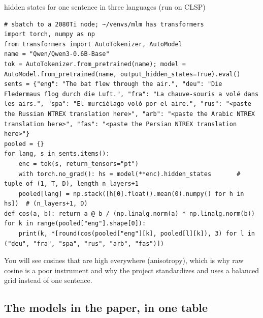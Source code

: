 \begin{exercise}{hidden states for one sentence in three languages (run on CLSP)}
\begin{lstlisting}
# sbatch to a 2080Ti node; ~/venvs/mlm has transformers
import torch, numpy as np
from transformers import AutoTokenizer, AutoModel
name = "Qwen/Qwen3-0.6B-Base"
tok = AutoTokenizer.from_pretrained(name); model = AutoModel.from_pretrained(name, output_hidden_states=True).eval()
sents = {"eng": "The bat flew through the air.", "deu": "Die Fledermaus flog durch die Luft.", "fra": "La chauve-souris a volé dans les airs.", "spa": "El murciélago voló por el aire.", "rus": "<paste the Russian NTREX translation here>", "arb": "<paste the Arabic NTREX translation here>", "fas": "<paste the Persian NTREX translation here>"}
pooled = {}
for lang, s in sents.items():
    enc = tok(s, return_tensors="pt")
    with torch.no_grad(): hs = model(**enc).hidden_states       # tuple of (1, T, D), length n_layers+1
    pooled[lang] = np.stack([h[0].float().mean(0).numpy() for h in hs])  # (n_layers+1, D)
def cos(a, b): return a @ b / (np.linalg.norm(a) * np.linalg.norm(b))
for k in range(pooled["eng"].shape[0]):
    print(k, *[round(cos(pooled["eng"][k], pooled[l][k]), 3) for l in ("deu", "fra", "spa", "rus", "arb", "fas")])
\end{lstlisting}
You will see cosines that are high everywhere (anisotropy), which is why raw
cosine is a poor instrument and why the project standardizes and uses a
balanced grid instead of one sentence.
\end{exercise}

\subsection{The models in the paper, in one table}


